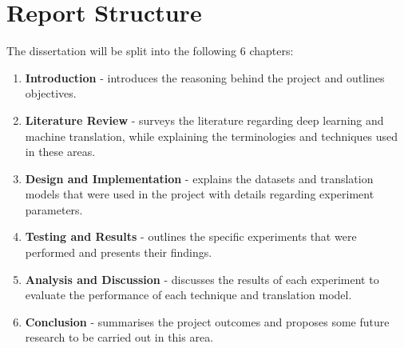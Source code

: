 \section{Report Structure}
The dissertation will be split into the following 6 chapters:
\begin{enumerate}
    \item \textbf{Introduction} - introduces the reasoning behind the project and outlines objectives.
    \item \textbf{Literature Review} - surveys the literature regarding deep learning and machine translation, while explaining the terminologies and techniques used in these areas.
    \item \textbf{Design and Implementation} - explains the datasets and translation models that were used in the project with details regarding experiment parameters.
    \item \textbf{Testing and Results} - outlines the specific experiments that were performed and presents their findings.
    \item \textbf{Analysis and Discussion} - discusses the results of each experiment to evaluate the performance of each technique and translation model.
    \item \textbf{Conclusion} - summarises the project outcomes and proposes some future research to be carried out in this area.
\end{enumerate}